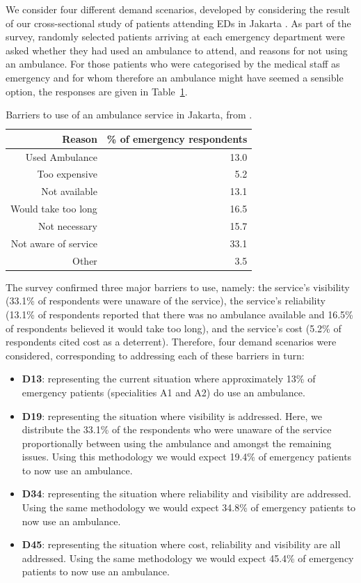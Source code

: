 \documentclass[preprint,12pt]{elsarticle}
\begin{document}
We consider four different demand scenarios, developed by considering the
result of our cross-sectional study of patients attending EDs in Jakarta
\cite{BriceSyaribahNoor2022Esui}. As part of the survey, randomly selected
patients arriving at each emergency department were asked whether they had
used an ambulance to attend, and reasons for not using an ambulance. For those
patients who were categorised by the medical staff as emergency and for whom
therefore an ambulance might have seemed a sensible option, the responses are
given in Table~\ref{table:survey_results}.

\begin{table}
\centering
\begin{tabular}{rr}
\toprule
Reason & \% of emergency respondents \\
\midrule
Used Ambulance & 13.0\\
Too expensive & 5.2  \\
Not available  & 13.1 \\
Would take too long & 16.5 \\
Not necessary & 15.7  \\
Not aware of service & 33.1\\
Other &3.5 \\
\bottomrule
\end{tabular}
\caption{Barriers to use of an ambulance service in Jakarta, from
         \cite{BriceSyaribahNoor2022Esui}.}
\label{table:survey_results}
\end{table}

The survey confirmed three major barriers to use, namely: the service's
visibility (33.1\% of respondents were unaware of the service), the service's
reliability (13.1\% of respondents reported that there was no ambulance
available and 16.5\% of respondents believed it would take too long), and the
service's cost (5.2\% of respondents cited cost as a deterrent). Therefore,
four demand scenarios were considered, corresponding to addressing each of
these barriers in turn:

\begin{itemize}
  \item \textbf{D13}: representing the current situation where approximately
        13\% of emergency patients (specialities A1 and A2) do use an ambulance.
  \item \textbf{D19}: representing the situation where visibility is addressed.
        Here, we distribute the 33.1\% of the respondents who were unaware of
        the service proportionally between using the ambulance and amongst the
        remaining issues. Using this methodology we would expect 19.4\% of
        emergency patients to now use an ambulance.  
  \item \textbf{D34}: representing the situation where reliability and
        visibility are addressed. Using the same methodology we would expect
        34.8\% of emergency patients to now use an ambulance.
  \item \textbf{D45}: representing the situation where cost, reliability and
        visibility are all addressed. Using the same methodology we would expect
        45.4\% of emergency patients to now use an ambulance. 
\end{itemize}
\end{document}

